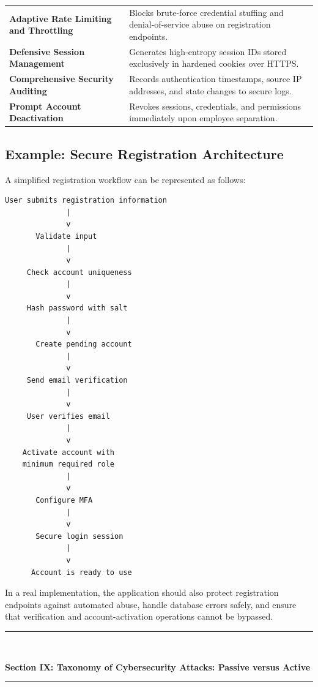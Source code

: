 \begin{table}[htbp]
\begin{tabularx}{\textwidth}{p{4.5cm} X}
\textbf{Adaptive Rate Limiting and Throttling} & Blocks brute-force credential stuffing and denial-of-service abuse on registration endpoints. \\
\textbf{Defensive Session Management} & Generates high-entropy session IDs stored exclusively in hardened cookies over HTTPS. \\
\textbf{Comprehensive Security Auditing} & Records authentication timestamps, source IP addresses, and state changes to secure logs. \\
\textbf{Prompt Account Deactivation} & Revokes sessions, credentials, and permissions immediately upon employee separation. \\
\bottomrule
\end{tabularx}
\end{table}


\subsection{Example: Secure Registration Architecture}

A simplified registration workflow can be represented as follows:

\begin{lstlisting}
User submits registration information
              |
              v
       Validate input
              |
              v
     Check account uniqueness
              |
              v
     Hash password with salt
              |
              v
       Create pending account
              |
              v
     Send email verification
              |
              v
     User verifies email
              |
              v
    Activate account with
    minimum required role
              |
              v
       Configure MFA
              |
              v
       Secure login session
              |
              v
      Account is ready to use
\end{lstlisting}

In a real implementation, the application should also protect registration endpoints against automated abuse, handle database errors safely, and ensure that verification and account-activation operations cannot be bypassed.


\newpage
\begin{center}
\vspace{0.5em}
{\color{primary}\rule{0.45\textwidth}{1.2pt}\\[4pt]}
{\Large\bfseries\color{primary} Section IX: Taxonomy of Cybersecurity Attacks: Passive versus Active\\[2pt]}
{\color{primary}\rule{0.45\textwidth}{1.2pt}}
\vspace{0.5em}
\end{center}

